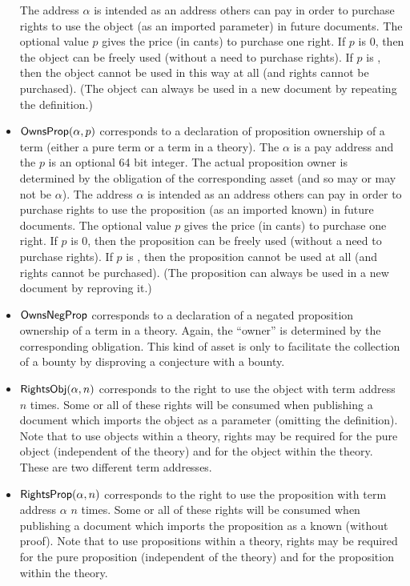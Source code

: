 \begin{itemize}
The address $\alpha$ is intended as an address others can pay in order to purchase rights
to use the object (as an imported parameter) in future documents.
The optional value $p$ gives the price (in cants) to purchase one right.
If $p$ is $0$, then the object can be freely used (without a need to purchase rights).
If $p$ is {}, then the object cannot be used
in this way at all (and rights cannot be purchased).
(The object can always be used in a new document by repeating the definition.)
\item ${\constr{OwnsProp}}(\alpha,p)$ corresponds to a declaration of proposition ownership of a term (either
a pure term or a term in a theory).
The $\alpha$ is a pay address and the $p$ is an optional 64 bit integer.
The actual proposition owner is determined by the obligation of the corresponding asset (and so may
or may not be $\alpha$).
The address $\alpha$ is intended as an address others can pay in order to purchase rights
to use the proposition (as an imported known) in future documents.
The optional value $p$ gives the price (in cants) to purchase one right.
If $p$ is $0$, then the proposition can be freely used (without a need to purchase rights).
If $p$ is {}, then the proposition cannot be used at all (and rights cannot be purchased).
(The proposition can always be used in a new document by reproving it.)
\item ${\constr{OwnsNegProp}}$ corresponds to a declaration of a negated proposition ownership of a term
in a theory.
Again, the ``owner'' is determined by the corresponding obligation.
This kind of asset is only to facilitate the collection of a bounty by disproving a conjecture
with a bounty.
\item ${\constr{RightsObj}}(\alpha,n)$ corresponds to the right to use
the object with term address $n$ times.
Some or all of these rights will be consumed when publishing a document which imports the object
as a parameter (omitting the definition).
Note that to use objects within a theory, rights may be required for the
pure object (independent of the theory) and for the object within the theory.
These are two different term addresses.
\item ${\constr{RightsProp}}(\alpha,n)$ corresponds to the right to use the proposition
with term address $\alpha$ $n$ times.
Some or all of these rights will be consumed when publishing a document which imports the proposition
as a known (without proof).
Note that to use propositions within a theory, rights may be required for the
pure proposition (independent of the theory) and for the proposition within the theory.

\end{itemize}
